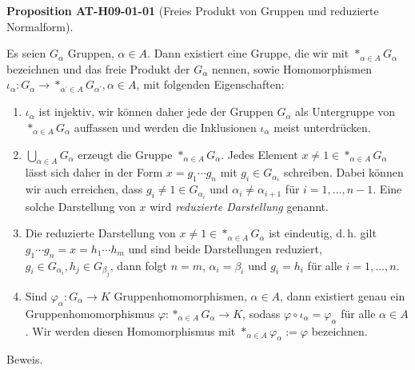 \documentclass[10pt, letterpaper]{article}
\newcommand{\CustomHeading}[3]{%
  \par\medskip\noindent%
  \textbf{#1 #2} \textnormal{(#3)}.\enskip%
}
\newenvironment{PROP}[2]{\begin{unitbox}\CustomHeading{Proposition}{#1}{#2}}{\end{unitbox}}
\begin{document}
\begin{PROP}{AT-H09-01-01}{Freies Produkt von Gruppen und reduzierte Normalform}
Es seien $G_\alpha$ Gruppen, $\alpha \in A$. Dann existiert eine Gruppe, die wir mit $*_{\alpha \in A} G_\alpha$ bezeichnen und das freie Produkt der $G_\alpha$ nennen, sowie Homomorphismen $\iota_\alpha: G_\alpha \rightarrow *_{\alpha^{\prime} \in A} G_{\alpha^{\prime}}, \alpha \in A$, mit folgenden Eigenschaften:
\begin{enumerate}
  \item $\iota_\alpha$ ist injektiv, wir können daher jede der Gruppen $G_\alpha$ als Untergruppe von $*_{\alpha \in A} G_\alpha$ auffassen und werden die Inklusionen $\iota_\alpha$ meist unterdrücken.
  
  \item $\bigcup_{\alpha \in A} G_\alpha$ erzeugt die Gruppe $*_{\alpha \in A} G_\alpha$. Jedes Element $x \neq 1 \in *_{\alpha \in A} G_\alpha$ lässt sich daher in der Form $x = g_1 \cdots g_n$ mit $g_i \in G_{\alpha_i}$ schreiben. Dabei können wir auch erreichen, dass $g_i \neq 1 \in G_{\alpha_i}$ und $\alpha_i \neq \alpha_{i+1}$ für $i = 1, \ldots, n-1$. Eine solche Darstellung von $x$ wird \emph{reduzierte Darstellung} genannt.
  
  \item Die reduzierte Darstellung von $x \neq 1 \in *_{\alpha \in A} G_\alpha$ ist eindeutig, d.\,h. gilt $g_1 \cdots g_n = x = h_1 \cdots h_m$ und sind beide Darstellungen reduziert, $g_i \in G_{\alpha_i}, h_j \in G_{\beta_j}$, dann folgt $n = m$, $\alpha_i = \beta_i$ und $g_i = h_i$ für alle $i = 1, \ldots, n$.
  
  \item Sind $\varphi_\alpha: G_\alpha \rightarrow K$ Gruppenhomomorphismen, $\alpha \in A$, dann existiert genau ein Gruppenhomomorphismus $\varphi: *_{\alpha \in A} G_\alpha \rightarrow K$, sodass $\varphi \circ \iota_\alpha = \varphi_\alpha$ für alle $\alpha \in A$. Wir werden diesen Homomorphismus mit $*_{\alpha \in A} \varphi_\alpha := \varphi$ bezeichnen.
\end{enumerate}
\end{PROP}



Beweis. 
\end{document}

